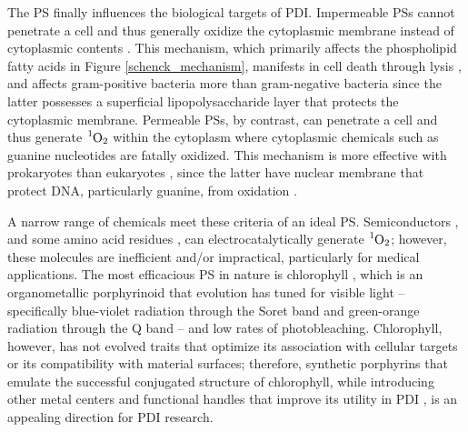The PS finally influences the biological targets of PDI. Impermeable PSs cannot penetrate a cell and thus generally oxidize the cytoplasmic membrane \cite{Specht1990DepolarizationAction,Ehrenberg1993ElectricAlterations} instead of cytoplasmic contents \cite{Maisch2004AntibacterialDermatology}. This mechanism, which primarily affects the phospholipid fatty acids in Figure \ref{schenck_mechanism}, manifests in cell death through lysis \cite{Sahu2009AtomicColi,Bertoloni1987RoleCells}, and affects gram-positive bacteria more than gram-negative bacteria \cite{Lauro2002PhotoinactivationConjugates,Merchat1996Meso-substitutedBacteria} since the latter possesses a superficial lipopolysaccharide layer that protects the cytoplasmic membrane. Permeable PSs, by contrast, can penetrate a cell and thus generate $\ce{^1O2}$ within the cytoplasm where cytoplasmic chemicals \cite{Bagchi1979RoleAcriflavine} such as guanine nucleotides \cite{Prat1997Determination9,Devasagayam1991FormationOxygen} are fatally oxidized. This mechanism is more effective with prokaryotes than eukaryotes \cite{Quishida2016PhotodynamicLight}, since the latter have nuclear membrane that protect DNA, particularly guanine, from oxidation \cite{Pereira2013PhotodynamicVitro}.

A narrow range of chemicals meet these criteria of an ideal PS. Semiconductors \cite{Nelson2002PhotoconductivityDioxide,Peiro2006PhotochemicalPreparations,Linsebigler1995PhotocatalysisResults}, and some amino acid residues \cite{Lippincott-schwartz2003PhotobleachingTechniques,Jin1995PhotolysisSolution}, can electrocatalytically generate $\ce{^1O2}$; however, these molecules are inefficient and/or impractical, particularly for medical applications. The most efficacious PS in nature is chlorophyll \cite{Ramel2012ChemicalPlants}, which is an organometallic porphyrinoid that evolution has tuned for visible light -- specifically blue-violet radiation \cite{Mtangi2017ControlSplitting} through the Soret band \cite{Carre1999FungicidalCerevisiae,Pereira2014InfluencePorphyrin,Ashkenazi2003PhotodynamicBacteria,Moan1986PorphyrinShGroups,Nitzan1992InactivationPorphyrins,Durantini2006PhotodynamicBacteria,Salmon-Divon2004MechanisticTetra-mesoN-methylpyridylporphine} and green-orange radiation \cite{Bertoloni2000PhotosensitizingCells} through the Q band \cite{Bonnett1999PhotobleachingStudy,Jori2006PhotodynamicApplications,Gad2004TargetedMice,Zhao2019Porphyrin-basedAbsorption} -- and low rates of photobleaching. Chlorophyll, however, has not evolved traits that optimize its association with cellular targets or its compatibility with material surfaces; therefore, synthetic porphyrins \cite{Orenstein1997TheInfections,Beirao2014PhotodynamicPorphyrin,Merchat1996StudiesPorphyrins} that emulate the successful conjugated structure \cite{Huang2008Porphyrin-dithienothiopheneCells} of chlorophyll, while introducing other metal centers \cite{Mosinger1997QuantumPorphine} and functional handles  \cite{Hirao1999TheoreticalDerivatives,Wu2014BODIPY-basedSolution,Chacon1988SingletArachidonic} that improve its utility in PDI \cite{Jager2016QScales,Karolczak2004PhotophysicalTetraphenylporphyrin,Mathai2007SingletTherapy}, is an appealing direction for PDI research. 

